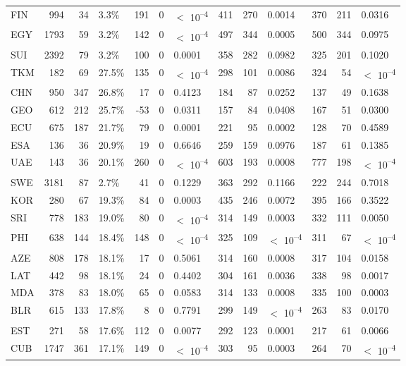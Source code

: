 \begin{tabular}[t]{lrrlrrlrrlrrl}
FIN & 994 & 34 & 3.3\% & 191 & 0 & $<$ 10\textsuperscript{--4} & 411 & 270 & 0.0014 & 370 & 211 & 0.0316\\
EGY & 1793 & 59 & 3.2\% & 142 & 0 & $<$ 10\textsuperscript{--4} & 497 & 344 & 0.0005 & 500 & 344 & 0.0975\\
SUI & 2392 & 79 & 3.2\% & 100 & 0 & 0.0001 & 358 & 282 & 0.0982 & 325 & 201 & 0.1020\\
TKM & 182 & 69 & 27.5\% & 135 & 0 & $<$ 10\textsuperscript{--4} & 298 & 101 & 0.0086 & 324 & 54 & $<$ 10\textsuperscript{--4}\\
CHN & 950 & 347 & 26.8\% & 17 & 0 & 0.4123 & 184 & 87 & 0.0252 & 137 & 49 & 0.1638\\
GEO & 612 & 212 & 25.7\% & -53 & 0 & 0.0311 & 157 & 84 & 0.0408 & 167 & 51 & 0.0300\\
ECU & 675 & 187 & 21.7\% & 79 & 0 & 0.0001 & 221 & 95 & 0.0002 & 128 & 70 & 0.4589\\
ESA & 136 & 36 & 20.9\% & 19 & 0 & 0.6646 & 259 & 159 & 0.0976 & 187 & 61 & 0.1385\\
UAE & 143 & 36 & 20.1\% & 260 & 0 & $<$ 10\textsuperscript{--4} & 603 & 193 & 0.0008 & 777 & 198 & $<$ 10\textsuperscript{--4}\\
SWE & 3181 & 87 & 2.7\% & 41 & 0 & 0.1229 & 363 & 292 & 0.1166 & 222 & 244 & 0.7018\\
KOR & 280 & 67 & 19.3\% & 84 & 0 & 0.0003 & 435 & 246 & 0.0072 & 395 & 166 & 0.3522\\
SRI & 778 & 183 & 19.0\% & 80 & 0 & $<$ 10\textsuperscript{--4} & 314 & 149 & 0.0003 & 332 & 111 & 0.0050\\
PHI & 638 & 144 & 18.4\% & 148 & 0 & $<$ 10\textsuperscript{--4} & 325 & 109 & $<$ 10\textsuperscript{--4} & 311 & 67 & $<$ 10\textsuperscript{--4}\\
AZE & 808 & 178 & 18.1\% & 17 & 0 & 0.5061 & 314 & 160 & 0.0008 & 317 & 104 & 0.0158\\
LAT & 442 & 98 & 18.1\% & 24 & 0 & 0.4402 & 304 & 161 & 0.0036 & 338 & 98 & 0.0017\\
MDA & 378 & 83 & 18.0\% & 65 & 0 & 0.0583 & 314 & 133 & 0.0008 & 335 & 100 & 0.0003\\
BLR & 615 & 133 & 17.8\% & 8 & 0 & 0.7791 & 299 & 149 & $<$ 10\textsuperscript{--4} & 263 & 83 & 0.0170\\
EST & 271 & 58 & 17.6\% & 112 & 0 & 0.0077 & 292 & 123 & 0.0001 & 217 & 61 & 0.0066\\
CUB & 1747 & 361 & 17.1\% & 149 & 0 & $<$ 10\textsuperscript{--4} & 303 & 95 & 0.0003 & 264 & 70 & $<$ 10\textsuperscript{--4}\\

\end{tabular}
